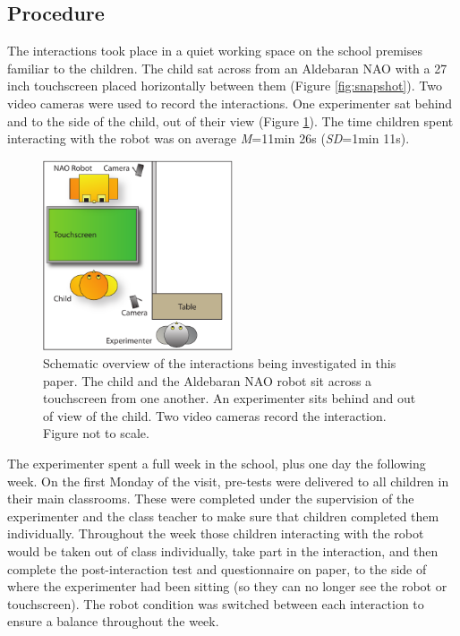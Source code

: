 \subsection{Procedure}\label{sec:verbal-proc}
The interactions took place in a quiet working space on the school premises familiar to the children. The child sat across from an Aldebaran NAO with a 27 inch touchscreen placed horizontally between them (Figure \ref{fig:snapshot}). Two video cameras were used to record the interactions. One experimenter sat behind and to the side of the child, out of their view (Figure \ref{fig:schematic}). The time children spent interacting with the robot was on average \textit{M}=11min 26s (\textit{SD}=1min 11s).

\begin{figure}[t!]
    \centering
    \includegraphics[width=0.5\textwidth]{images/ch9_Schematic.pdf}
    \caption{Schematic overview of the interactions being investigated in this paper. The child and the Aldebaran NAO robot sit across a touchscreen from one another. An experimenter sits behind and out of view of the child. Two video cameras record the interaction. Figure not to scale.}
    \label{fig:schematic}
\end{figure}

The experimenter spent a full week in the school, plus one day the following week. On the first Monday of the visit, pre-tests were delivered to all children in their main classrooms. These were completed under the supervision of the experimenter and the class teacher to make sure that children completed them individually. Throughout the week those children interacting with the robot would be taken out of class individually, take part in the interaction, and then complete the post-interaction test and questionnaire on paper, to the side of where the experimenter had been sitting (so they can no longer see the robot or touchscreen). The robot condition was switched between each interaction to ensure a balance throughout the week.

